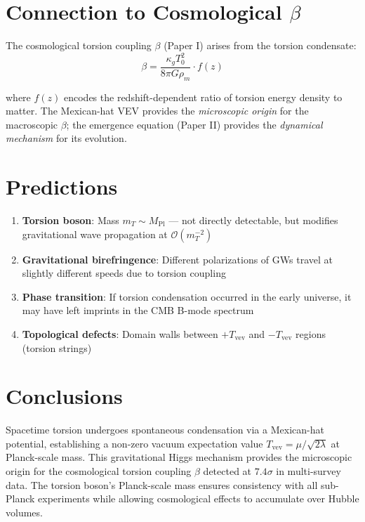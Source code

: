 \documentclass[twocolumn,prd,superscriptaddress,nofootinbib]{revtex4-2}
\begin{document}
\section{Connection to Cosmological $\beta$}

The cosmological torsion coupling $\beta$ (Paper I) arises from the torsion condensate:
\begin{equation}
\beta = \frac{\kappa_g T_0^2}{8\pi G \rho_m} \cdot f(z)
\end{equation}

where $f(z)$ encodes the redshift-dependent ratio of torsion energy density to matter. The Mexican-hat VEV provides the \emph{microscopic origin} for the macroscopic $\beta$; the emergence equation (Paper II) provides the \emph{dynamical mechanism} for its evolution.

\section{Predictions}

\begin{enumerate}
\item \textbf{Torsion boson}: Mass $m_T \sim M_\text{Pl}$ --- not directly detectable, but modifies gravitational wave propagation at $\mathcal{O}(m_T^{-2})$
\item \textbf{Gravitational birefringence}: Different polarizations of GWs travel at slightly different speeds due to torsion coupling
\item \textbf{Phase transition}: If torsion condensation occurred in the early universe, it may have left imprints in the CMB B-mode spectrum
\item \textbf{Topological defects}: Domain walls between $+T_\text{vev}$ and $-T_\text{vev}$ regions (torsion strings)
\end{enumerate}

\section{Conclusions}

Spacetime torsion undergoes spontaneous condensation via a Mexican-hat potential, establishing a non-zero vacuum expectation value $T_\text{vev} = \mu/\sqrt{2\lambda}$ at Planck-scale mass. This gravitational Higgs mechanism provides the microscopic origin for the cosmological torsion coupling $\beta$ detected at $7.4\sigma$ in multi-survey data. The torsion boson's Planck-scale mass ensures consistency with all sub-Planck experiments while allowing cosmological effects to accumulate over Hubble volumes.
\end{document}
